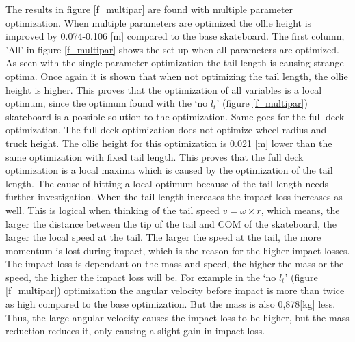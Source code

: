 \documentclass[default,iicol]{sn-jnl}
\begin{document}
\noindent The results in figure \ref{f_multipar} are found with multiple parameter optimization. When multiple parameters are optimized the ollie height is improved by 0.074-0.106 [m] compared to the base skateboard. The first column, 'All' in figure \ref{f_multipar} shows the set-up when all parameters are optimized. As seen with the single parameter optimization the tail length is causing strange optima. Once again it is shown that when not optimizing the tail length, the ollie height is higher. This proves that the optimization of all variables is a local optimum, since the optimum found with the `no $l_t$' (figure \ref{f_multipar}) skateboard is a possible solution to the optimization. Same goes for the full deck optimization. The full deck optimization does not optimize wheel radius and truck height. The ollie height for this optimization is 0.021 [m] lower than the same optimization with fixed tail length. This proves that the full deck optimization is a local maxima which is caused by the optimization of the tail length. The cause of hitting a local optimum because of the tail length needs further investigation. When the tail length increases the impact loss increases as well. This is logical when thinking of the tail speed $v = \omega \times r$, which means, the larger the distance between the tip of the tail and COM of the skateboard, the larger the local speed at the tail. The larger the speed at the tail, the more momentum is lost during impact, which is the reason for the higher impact losses. The impact loss is dependant on the mass and speed, the higher the mass or the speed, the higher the impact loss will be. For example in the `no $l_t$' (figure \ref{f_multipar}) optimization the angular velocity before impact is more than twice as high compared to the base optimization. But the mass is also 0,878[kg] less. Thus, the large angular velocity causes the impact loss to be higher, but the mass reduction reduces it, only causing a slight gain in impact loss. 
\end{document}
